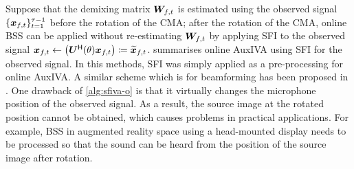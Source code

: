 \documentclass[sip,biber]{now-journal}
\begin{document}
Suppose that the demixing matrix $\Demix _{\ft}$ is estimated using the observed signal $\{\Obs _{\ft}\} _{\tframe = 1} ^{\rotFra - 1}$ before the rotation of the CMA;
after the rotation of the CMA, online BSS can be applied without re-estimating $\Demix _{\ft}$ by applying SFI to the observed signal
$\Obs _{\ft} \gets \left(\rotMat ^{\hermite} (\rotSpat) \Obs _{\ft}\right) \coloneqq \refpos{\Obs} _{\ft}$.
 summarises online AuxIVA using SFI for the observed signal.
In this methods, SFI was simply applied as a pre-processing for online AuxIVA.
A similar scheme which is for beamforming has been proposed in \cite{Wakabayashi:2023:ASLP}.
One drawback of \cref{alg:sfiva-o} is that it virtually changes the microphone position of the observed signal.
As a result, the source image at the rotated position cannot be obtained, which causes problems in practical applications.
For example, BSS in augmented reality space using a head-mounted display needs to be processed so that the sound can be heard from the position of the source image after rotation.
\end{document}
